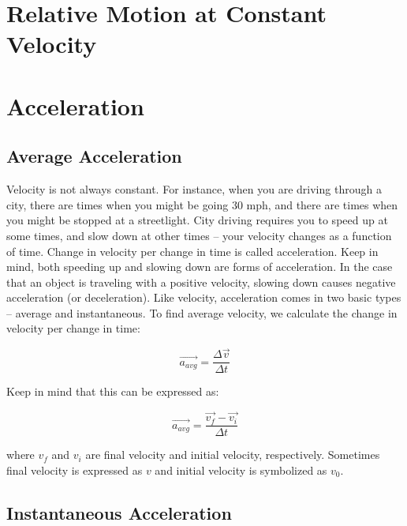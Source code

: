 	
	
	
	

\section{Relative Motion at Constant Velocity}


\section{Acceleration}
\subsection{Average Acceleration} 
Velocity is not always constant.  For instance, when you are driving through a city, there are times when you might be going 30 mph, and there are times when you might be stopped at a streetlight.  City driving requires you to speed up at some times, and slow down at other times – your velocity changes as a function of time.  Change in velocity per change in time is called \gls{acceleration}.  
Keep in mind, both speeding up and slowing down are forms of acceleration.  In the case that an object is traveling with a positive velocity, slowing down causes negative acceleration (or deceleration).
Like velocity, acceleration comes in two basic types – average and instantaneous.  To find average velocity, we calculate the change in velocity per change in time:

\begin{mdframed}[backgroundcolor=orange!20!white]
	\begin{equation}
	\overrightarrow{a_{avg}} = \frac{\Delta \vec{v}}{\Delta t} 
	\label{equation:averageacceleration}
	\end{equation}
\end{mdframed}	
Keep in mind that this can be expressed as:
\begin{mdframed}[backgroundcolor=orange!20!white]
	\begin{equation}
	\overrightarrow{a_{avg}} = \frac{\overrightarrow{v_f} - \overrightarrow {v_i}}{\Delta t}
	\label{equation:averageaccelerationalt}
	\end{equation}
\end{mdframed}	


where $v_f$ and $v_i$ are final velocity and initial velocity, respectively.  Sometimes final velocity is expressed as $v$ and initial velocity is symbolized as $v_0$. 

\subsection{Instantaneous Acceleration} 


